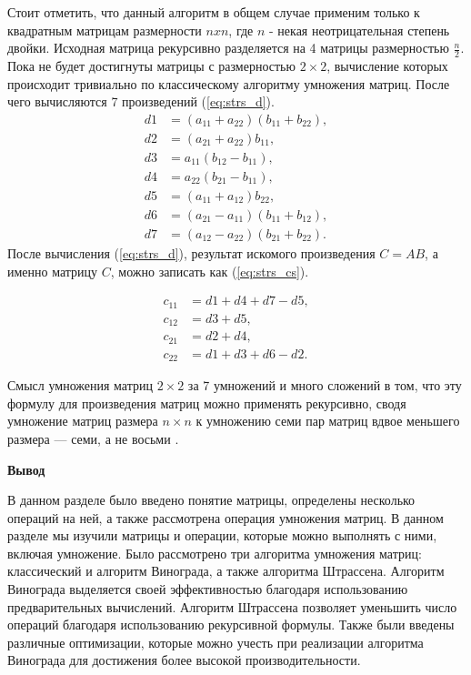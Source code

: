 Стоит отметить, что данный алгоритм в общем случае применим только к квадратным матрицам размерности $nxn$, где $n$ - некая неотрицательная степень двойки.
Исходная матрица рекурсивно разделяется на 4 матрицы размерностью $\frac{n}{2}$.
Пока не будет достигнуты матрицы с размерностью $2\times2$, вычисление которых происходит тривиально по классическому алгоритму умножения матриц. После чего вычисляются 7 произведений (\ref{eq:strs_d}).
\begin{equation}
	\label{eq:strs_d}
	\begin{aligned}
		d1 & = (a_{11} + a_{22})(b_{11}+b_{22}), \\
		d2 & = (a_{21} + a_{22})b_{11}, \\
		d3 & = a_{11}(b_{12}-b_{11}), \\
		d4 & = a_{22}(b_{21} - b_{11}),\\
		d5 & = (a_{11}+a_{12})b_{22}, \\
		d6 & = (a_{21} - a_{11})(b_{11} + b_{12}), \\
		d7 & = (a_{12} - a_{22})(b_{21} + b_{22}).
	\end{aligned}
\end{equation}
После вычисления (\ref{eq:strs_d}), результат искомого произведения $C=AB$, а именно
матрицу $C$, можно записать как (\ref{eq:strs_cs}).


\begin{equation}
	\label{eq:strs_cs}
	\begin{aligned}
		c_{11} & = d1 + d4 + d7 -d5, \\
		c_{12} & = d3 + d5, \\
		c_{21} & = d2 + d4, \\
		c_{22} & = d1 + d3 + d6 -d2.
	\end{aligned}
\end{equation}

Смысл умножения матриц $2\times2$ за 7 умножений и много сложений в том, что эту формулу для произведения
матриц можно применять рекурсивно, сводя умножение матриц размера $n\times n$ к умножению
семи пар матриц вдвое меньшего размера — семи, а не восьми \cite{stras}.




\textbf{Вывод}

В данном разделе было введено понятие матрицы, определены несколько операций на ней, 
а также рассмотрена операция умножения матриц.
В данном разделе мы изучили матрицы и операции, 
которые можно выполнять с ними, включая умножение. 
Было рассмотрено три алгоритма умножения матриц: классический и алгоритм Винограда, а также алгоритма Штрассена.
Алгоритм Винограда выделяется своей эффективностью благодаря использованию предварительных вычислений.
Алгоритм Штрассена позволяет уменьшить число операций благодаря использованию рекурсивной формулы.
Также были введены  различные оптимизации, которые можно учесть при реализации алгоритма Винограда для 
достижения более высокой производительности.